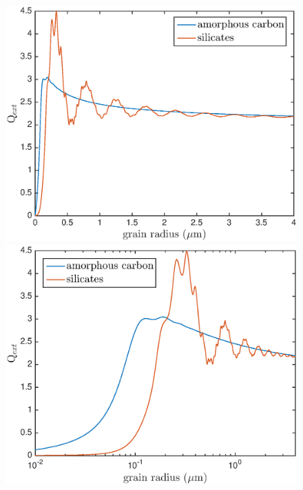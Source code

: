 
\begin{figure}
\begin{center}
\includegraphics[trim =37 10 45 15,clip=true,scale=0.51]{Qext_grainsize_upto4}
\includegraphics[trim =37 10 45 15,clip=true,scale=0.51]{Qext_grainsize_upto4_log}

\end{center}
\end{figure}

